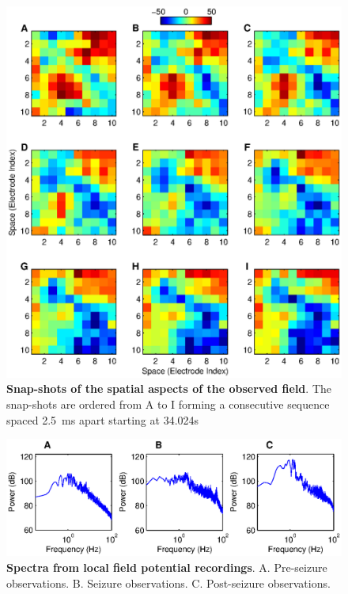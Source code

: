 \documentclass[]{article}
\begin{document}
\begin{figure}[!ht]
\begin{center}
\includegraphics{./Figures/FieldObservations.eps}
\end{center}
\caption{{\bf Snap-shots of the spatial aspects of the observed field}. The snap-shots are ordered from A to I forming a consecutive sequence spaced 2.5~ms apart starting at 34.024s}
\label{fig:FieldObserations}
\end{figure}

\begin{figure}[!ht]
\begin{center}
\includegraphics{./Figures/TemporalFreq.eps}
\end{center}
\caption{{\bf Spectra from local field potential recordings}. A. Pre-seizure observations. B. Seizure observations. C. Post-seizure observations.}
\label{fig:TemporalFreqObservation}
\end{figure}
\end{document}
